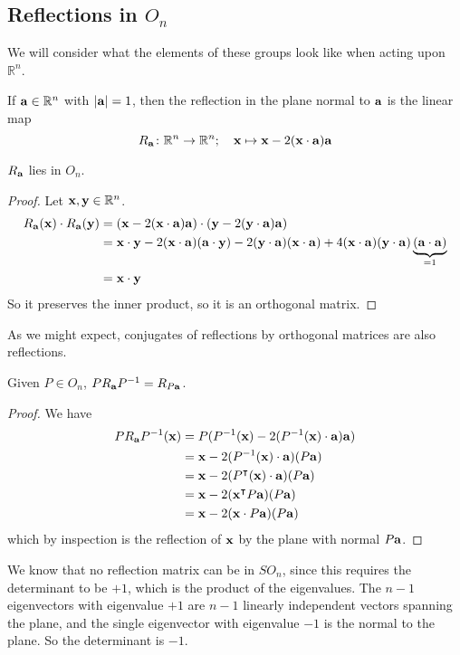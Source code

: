 \subsection{Reflections in \(O_n\)}
We will consider what the elements of these groups look like when acting upon \(\mathbb R^n\).
\begin{definition}
	If \(\vb a \in \mathbb R^n\) with \(\abs{\vb a} = 1\), then the reflection in the plane normal to \(\vb a\) is the linear map
	\[
		R_{\vb a} \colon \mathbb R^n \to \mathbb R^n;\quad \vb x \mapsto \vb x - 2 (\vb x \cdot \vb a) \vb a
	\]
\end{definition}
\begin{lemma}
	\(R_{\vb a}\) lies in \(O_n\).
\end{lemma}
\begin{proof}
	Let \(\vb x, \vb y \in \mathbb R^n\).
	\begin{align*}
		R_{\vb a}(\vb x) \cdot R_{\vb a}(\vb y) & = (\vb x - 2 (\vb x \cdot \vb a) \vb a) \cdot (\vb y - 2 (\vb y \cdot \vb a) \vb a)                                                                                                  \\
		                                        & = \vb x \cdot \vb y - 2(\vb x \cdot \vb a)(\vb a \cdot \vb y) - 2(\vb y\cdot \vb a)(\vb x \cdot \vb a) + 4(\vb x\cdot \vb a)(\vb y \cdot \vb a)\underbrace{(\vb a \cdot \vb a)}_{=1} \\
		                                        & = \vb x \cdot \vb y
	\end{align*}
	So it preserves the inner product, so it is an orthogonal matrix.
\end{proof}
As we might expect, conjugates of reflections by orthogonal matrices are also reflections.
\begin{lemma}
	Given \(P \in O_n\), \(PR_{\vb a}P^{-1} = R_{P\vb a}\).
\end{lemma}
\begin{proof}
	We have
	\begin{align*}
		PR_{\vb a}P^{-1}(\vb x) & = P(P^{-1}(\vb x) - 2 (P^{-1}(\vb x) \cdot \vb a) \vb a) \\
		                        & = \vb x - 2(P^{-1}(\vb x)\cdot\vb a)(P\vb a)             \\
		                        & = \vb x - 2(P^\intercal (\vb x)\cdot\vb a)(P\vb a)      \\
		                        & = \vb x - 2(\vb x^\intercal P \vb a)(P\vb a)            \\
		                        & = \vb x - 2(\vb x \cdot P\vb a)(P\vb a)
	\end{align*}
	which by inspection is the reflection of \(\vb x\) by the plane with normal \(P\vb a\).
\end{proof}
We know that no reflection matrix can be in \(SO_n\), since this requires the determinant to be \(+1\), which is the product of the eigenvalues.
The \(n-1\) eigenvectors with eigenvalue \(+1\) are \(n-1\) linearly independent vectors spanning the plane, and the single eigenvector with eigenvalue \(-1\) is the normal to the plane.
So the determinant is \(-1\).

